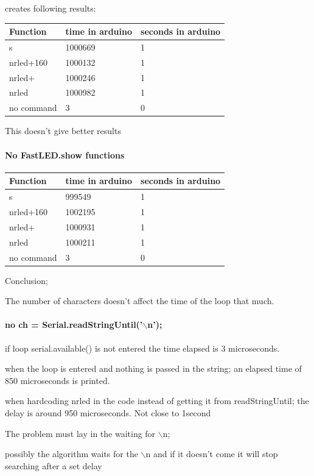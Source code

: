 \documentclass{article}
\begin{document}
creates following results:

\begin{tabular}{ |l|l|l| }
\hline
 Function & time in arduino & seconds in arduino \tabularnewline
\hline
\hline
 s & 1000669 & 1 \tabularnewline
\hline
 nrled+160 & 1000132 & 1 \tabularnewline
\hline
 nrled+ & 1000246 & 1 \tabularnewline
\hline
 nrled & 1000982 & 1 \tabularnewline
\hline
 no command & 3 & 0 \tabularnewline
\hline
\end{tabular}


This doesn't give better results



\paragraph{No FastLED.show functions}

\begin{tabular}{ |l|l|l| }
\hline
 Function & time in arduino & seconds in arduino \tabularnewline
\hline
\hline
 s & 999549 & 1 \tabularnewline
\hline
 nrled+160 & 1002195 & 1 \tabularnewline
\hline
 nrled+ & 1000931 & 1 \tabularnewline
\hline
 nrled & 1000211 & 1 \tabularnewline
\hline
 no command & 3 & 0 \tabularnewline
\hline
\end{tabular}


Conclusion;

The number of characters doesn't affect the time of the loop that much.



\paragraph{no ch = Serial.readStringUntil('$\backslash$n');}

if loop serial.available() is not entered the time elapsed is 3 microseconds.

when the loop is entered and nothing is passed in the string; an elapsed time of 850 microseconds is printed. 

when hardcoding nrled in the code instead of getting it from readStringUntil; the delay is around 950 microseconds. Not close to 1second



The problem must lay in the waiting for $\backslash$n;

possibly the algorithm waits for the $\backslash$n and if it doesn't come it will stop searching after a set delay
\end{document}
